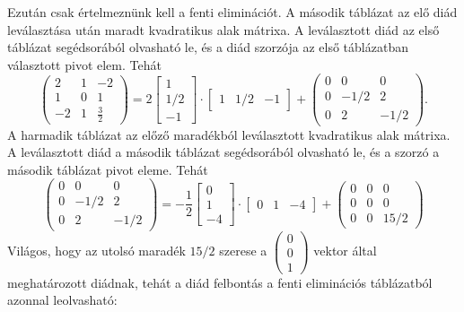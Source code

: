 \documentclass[a4paper, showtrims]{memoir}
\theoremstyle{plain}
\theoremstyle{remark}
\theoremstyle{definition}
\begin{document}
Ezután csak értelmeznünk kell a fenti eliminációt.
A második táblázat az elő diád leválasztása után maradt kvadratikus alak mátrixa.
A leválasztott diád az első táblázat segédsorából olvasható le, 
és a diád szorzója az első táblázatban választott pivot elem.
Tehát
\[
    \begin{pmatrix}
        2&1&-2\\
        1&0&1\\
        -2&1&\frac{3}{2}
    \end{pmatrix}
    =
    2
    \begin{bmatrix}
        1\\1/2\\-1
    \end{bmatrix}
    \cdot
    \begin{bmatrix}
        1&1/2&-1
    \end{bmatrix}
    +
    \begin{pmatrix}
        0&0&0\\
        0&-1/2&2\\
        0&2&-1/2
    \end{pmatrix}.
\]
A harmadik táblázat az előző maradékból leválasztott kvadratikus alak mátrixa.
A leválasztott diád a második táblázat segédsorából olvasható le, 
és a szorzó a második táblázat pivot eleme.
Tehát
\[
    \begin{pmatrix}
        0&0&0\\
        0&-1/2&2\\
        0&2&-1/2
    \end{pmatrix}
    =
    -\frac{1}{2}
    \begin{bmatrix}
        0\\1\\-4
    \end{bmatrix}
    \cdot
    \begin{bmatrix}
        0&1&-4
    \end{bmatrix}
    +
    \begin{pmatrix}
        0&0&0\\
        0&0&0\\
        0&0&15/2
    \end{pmatrix}
\]
Világos, hogy az utolsó maradék $15/2$ szerese a 
\(
\begin{pmatrix}
    0\\0\\1
\end{pmatrix}
\)
vektor által meghatározott diádnak, tehát a diád felbontás a fenti eliminációs táblázatból azonnal leolvasható:
\end{document}
